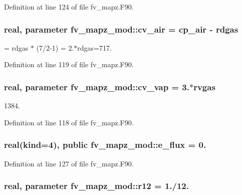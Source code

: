 \begin{DoxyEnumerate}
\item 
\end{DoxyEnumerate}

Definition at line 124 of file fv\-\_\-mapz.\-F90.

\subsubsection[{cv\-\_\-air}]{\setlength{\rightskip}{0pt plus 5cm}real, parameter fv\-\_\-mapz\-\_\-mod\-::cv\-\_\-air = cp\-\_\-air -\/ rdgas}\label{classfv__mapz__mod_ac280285d39826f98f83043a75f01d44e}


= rdgas $\ast$ (7/2-\/1) = 2.$\ast$rdgas=717. 



Definition at line 119 of file fv\-\_\-mapz.\-F90.

\subsubsection[{cv\-\_\-vap}]{\setlength{\rightskip}{0pt plus 5cm}real, parameter fv\-\_\-mapz\-\_\-mod\-::cv\-\_\-vap = 3.$\ast$rvgas}\label{classfv__mapz__mod_a4c1b41c250d4fae86c8297ebe5f71577}


1384. 



Definition at line 118 of file fv\-\_\-mapz.\-F90.

\subsubsection[{e\-\_\-flux}]{\setlength{\rightskip}{0pt plus 5cm}real(kind=4), public fv\-\_\-mapz\-\_\-mod\-::e\-\_\-flux = 0.}\label{classfv__mapz__mod_a5f144b640540ec10df24f75e367c2057}


Definition at line 127 of file fv\-\_\-mapz.\-F90.

\subsubsection[{r12}]{\setlength{\rightskip}{0pt plus 5cm}real, parameter fv\-\_\-mapz\-\_\-mod\-::r12 = 1./12.}\label{classfv__mapz__mod_abb8dc5fd25041ba11e452a3994360336}


